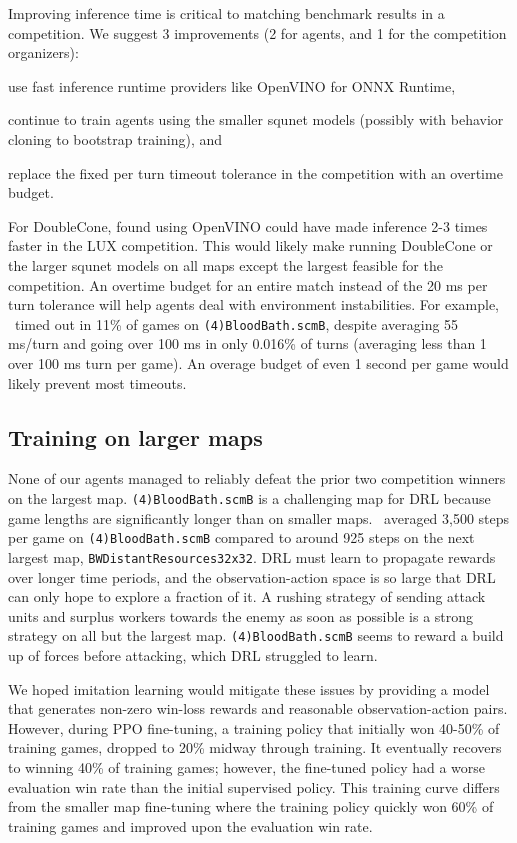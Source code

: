\documentclass[conference]{IEEEtran}
\begin{document}
Improving inference time is critical to matching benchmark results in a competition.
We suggest 3 improvements (2 for agents, and 1 for the competition organizers):
\begin{inparaenum}[(1)]
    \item use fast inference runtime providers like OpenVINO for ONNX Runtime,
    \item continue to train agents using the smaller squnet models (possibly with
    behavior cloning to bootstrap training), and
    \item replace the fixed per turn timeout tolerance in the competition with an overtime
    budget.
\end{inparaenum}
For DoubleCone, \cite{Ferdinand2021doublecone} found using OpenVINO could have made
inference 2-3 times faster in the LUX competition. This  would likely
make running DoubleCone or the larger squnet models on all maps except the largest
feasible for the competition. An overtime budget for an entire match instead of the 20 ms
per turn tolerance will help agents deal with environment instabilities. For example,
\bcPPOAgent\ timed out in 11\% of games on \texttt{(4)BloodBath.scmB}, despite averaging
55 ms/turn and going over 100 ms in only 0.016\% of turns (averaging less than 1 over
100 ms turn per game). An overage budget of even 1 second per game would likely prevent
most timeouts.

\subsection{Training on larger maps}
None of our agents managed to reliably defeat the prior two competition winners on 
the largest map. \texttt{(4)BloodBath.scmB} is a challenging map for DRL because game 
lengths are significantly longer than on smaller
maps. \bcPPOAgent\ averaged 3,500 steps per game on
\texttt{(4)BloodBath.scmB} compared to around 925 steps on the next largest map,
\texttt{BWDistantResources32x32}. DRL must learn to propagate rewards over longer time
periods, and the observation-action space is so large that DRL can only hope to explore a
fraction of it. A rushing strategy of sending attack units and surplus workers towards
the enemy as soon as possible is a strong strategy on all but the largest map.
\texttt{(4)BloodBath.scmB} seems to reward a build up of forces before attacking, which
DRL struggled to learn.

We hoped imitation learning would mitigate these issues by providing a model that
generates non-zero win-loss rewards and reasonable observation-action pairs.
However, during PPO fine-tuning, a training policy that initially won 40-50\% of
training games, dropped to 20\% midway through training. It eventually recovers to
winning 40\% of training games; however, the fine-tuned policy had a worse evaluation
win rate than the initial supervised policy. This training curve differs from the
smaller map fine-tuning where the training policy quickly won 60\% of
training games and improved upon the evaluation win rate.
\end{document}
